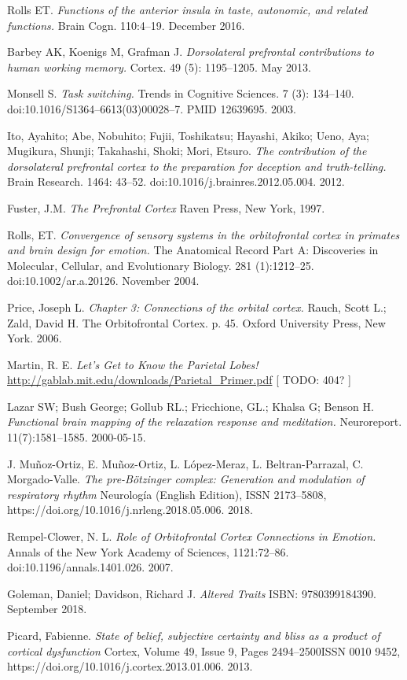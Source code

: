 \documentclass[twocolumn]{article}
\begin{document}
\begin{thebibliography}{9}
  Rolls ET.
  \textit{Functions of the anterior insula in taste, autonomic, and related
    functions.}
  Brain Cogn. 110:4–19. December 2016.

  Barbey AK, Koenigs M, Grafman J.
  \textit{Dorsolateral prefrontal contributions to human working memory.}
  Cortex. 49 (5): 1195–1205. May 2013.

  Monsell S.
  \textit{Task switching.}
  Trends in Cognitive Sciences. 7 (3):
  134–140. doi:10.1016/S1364–6613(03)00028–7. PMID 12639695. 2003.

  Ito, Ayahito; Abe, Nobuhito; Fujii, Toshikatsu; Hayashi, Akiko; Ueno, Aya;
  Mugikura, Shunji; Takahashi, Shoki; Mori, Etsuro.
  \textit{The contribution of the dorsolateral prefrontal cortex to the preparation
    for deception and truth-telling.}
  Brain Research. 1464: 43–52. doi:10.1016/j.brainres.2012.05.004. 2012.

  Fuster, J.M.
  \textit{The Prefrontal Cortex}
  Raven Press, New York, 1997.

  Rolls, ET.
  \textit{Convergence of sensory systems in the orbitofrontal
    cortex in primates and brain design for emotion.}
  The Anatomical Record Part A: Discoveries in Molecular, Cellular, and Evolutionary
  Biology. 281 (1):1212–25. doi:10.1002/ar.a.20126. November 2004.

  Price, Joseph L.
  \textit{Chapter 3: Connections of the orbital cortex.}
  Rauch, Scott L.; Zald, David H.
  The Orbitofrontal Cortex. p. 45.
  Oxford University Press, New York. 2006.

  Martin, R. E.
  \textit{Let’s Get to Know the Parietal Lobes!}
  \url{http://gablab.mit.edu/downloads/Parietal_Primer.pdf} [ TODO: 404? ]

  Lazar SW; Bush George; Gollub RL.; Fricchione, GL.; Khalsa G; Benson H.
  \textit{Functional brain mapping of the relaxation response and meditation.}
  Neuroreport. 11(7):1581–1585. 2000-05-15.

  J. Muñoz-Ortiz, E. Muñoz-Ortiz, L. López-Meraz, L. Beltran-Parrazal,
  C. Morgado-Valle.
  \textit{The pre-Bötzinger complex: Generation and modulation of respiratory rhythm}
  Neurología (English Edition), ISSN 2173–5808,
  https://doi.org/10.1016/j.nrleng.2018.05.006. 2018.

  Rempel-Clower, N. L.
  \textit{Role of Orbitofrontal Cortex Connections in Emotion.}
  Annals of the New York Academy of Sciences,
  1121:72–86. doi:10.1196/annals.1401.026. 2007.

  Goleman, Daniel; Davidson, Richard J.
  \textit{Altered Traits}
  ISBN: 9780399184390. September 2018.

  Picard, Fabienne.
  \textit{State of belief, subjective certainty and bliss as a product of cortical
    dysfunction}
  Cortex, Volume 49, Issue 9, Pages 2494–2500ISSN 0010 9452,
  https://doi.org/10.1016/j.cortex.2013.01.006. 2013.

\end{thebibliography}
\end{document}
